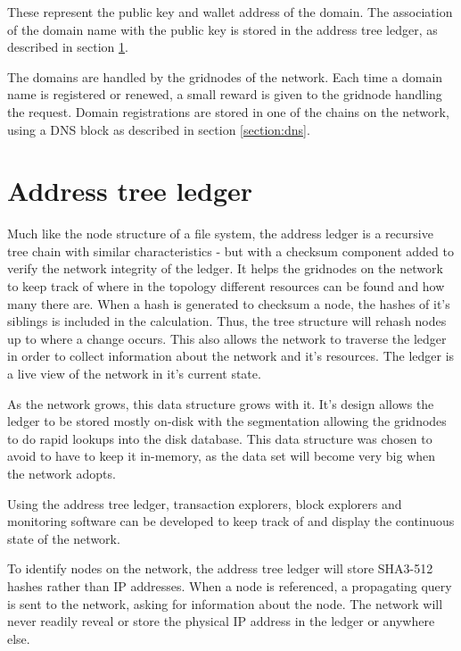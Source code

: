 \documentclass[10pt,a4paper,final]{article}
\begin{document}
\noindent These represent the public key and wallet address of the domain. The association of the domain name with the public key is stored in the address tree ledger, as described in section \ref{section:ledger}.

The domains are handled by the \glspl{gridnode} of the network. Each time a domain name is registered or renewed, a small reward is given to the \gls{gridnode} handling the request. Domain registrations are stored in one of the chains on the network, using a DNS block as described in section \ref{section:dns}.

\section{Address tree ledger}
\label{section:ledger}
Much like the node structure of a file system, the address ledger is a recursive tree chain with similar characteristics - but with a checksum component added to verify the network integrity of the ledger. It helps the \glspl{gridnode} on the network to keep track of where in the topology different resources can be found and how many there are. When a hash is generated to checksum a node, the hashes of it's siblings is included in the calculation. Thus, the tree structure will rehash nodes up to where a change occurs. This also allows the network to traverse the ledger in order to collect information about the network and it's resources. The ledger is a live view of the network in it's current state.

As the network grows, this data structure grows with it. It's design allows the ledger to be stored mostly on-disk with the segmentation allowing the \glspl{gridnode} to do rapid lookups into the disk database. This data structure was chosen to avoid to have to keep it in-memory, as the data set will become very big when the network adopts. 

Using the address tree ledger, transaction explorers, block explorers and monitoring software can be developed to keep track of and display the continuous state of the network.

To identify nodes on the network, the address tree ledger will store SHA3-512 hashes rather than IP addresses. When a node is referenced, a propagating query is sent to the network, asking for information about the node. The network will never readily reveal or store the physical IP address in the ledger or anywhere else.
\end{document}
